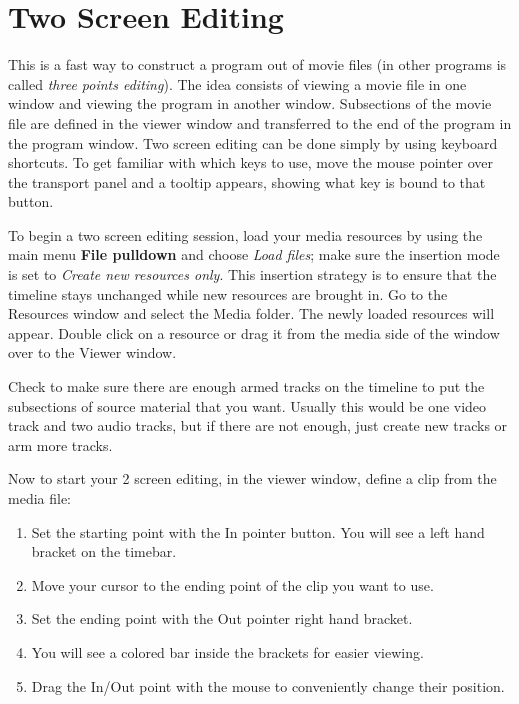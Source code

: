 \section{Two Screen Editing}%
\label{sec:two_screen_editing}

This is a fast way to construct a program out of movie files (in other programs is called \textit{three points editing}). The idea consists of viewing a movie file in one window and viewing the program in another window. Subsections of the movie file are defined in the viewer window and transferred to the end of the program in the program window.  Two screen editing can be done simply by using keyboard shortcuts.  To get familiar with which keys to use, move the mouse pointer over the transport panel and a tooltip appears, showing what key is bound to that button.

To begin a two screen editing session, load your media resources by using the main menu \textbf{File pulldown} and choose \textit{Load files}; make sure the insertion mode is set to \textit{Create new resources only}.  This insertion strategy is to ensure that the timeline stays unchanged while new resources are brought in. Go to the Resources window and select the Media folder. The newly loaded resources will appear. Double click on a resource or drag it from the media side of the window over to the Viewer window.

Check to make sure there are enough armed tracks on the timeline to put the subsections of source material that you want.  Usually this would be one video track and two audio tracks, but if there are not enough, just create new tracks or arm more tracks.

Now to start your 2 screen editing, in the viewer window, define a clip from the media file:

\begin{enumerate}
    \item Set the starting point with the In pointer button.  You will see a left hand bracket on the timebar.
    \item Move your cursor to the ending point of the clip you want to use.
    \item Set the ending point with the Out pointer right hand bracket.
    \item You will see a colored bar inside the brackets for easier viewing.
    \item Drag the In/Out point with the mouse to conveniently change their position.
\end{enumerate}


